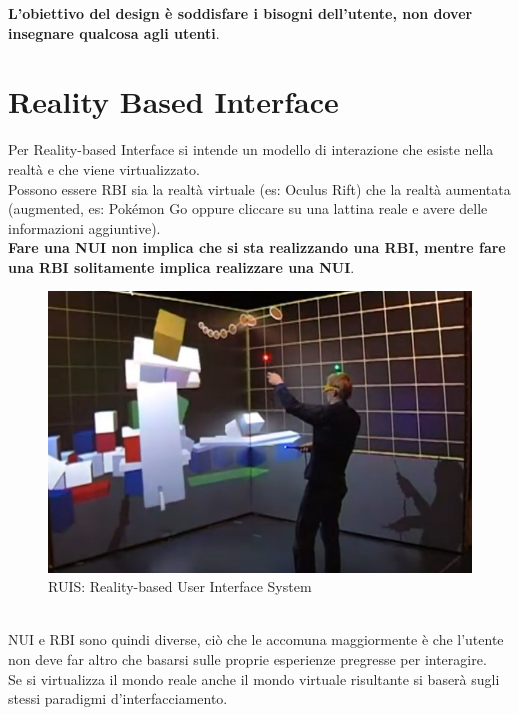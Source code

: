 \textbf{L'obiettivo del design è soddisfare i bisogni dell'utente, non dover insegnare qualcosa agli utenti}.


\section{Reality Based Interface}
Per Reality-based Interface si intende un modello di interazione che esiste nella realtà e che viene virtualizzato. \\
Possono essere RBI sia la realtà virtuale (es: Oculus Rift) che la realtà aumentata (augmented, es: Pokémon Go oppure cliccare su una lattina reale e avere delle informazioni aggiuntive).\\
\textbf{Fare una NUI non implica che si sta realizzando una RBI, mentre fare una RBI solitamente implica realizzare una NUI}.\\
\begin{figure}[!h]
	\centering
	\includegraphics[scale=0.4]{immagini/ruis.png}
	\caption{RUIS: Reality-based User Interface System}
\end{figure}
\\NUI e RBI sono quindi diverse, ciò che le accomuna maggiormente è che l'utente non deve far altro che basarsi sulle proprie esperienze pregresse per interagire.\\
Se si virtualizza il mondo reale anche il mondo virtuale risultante si baserà sugli stessi paradigmi d'interfacciamento.\\

\pagebreak

